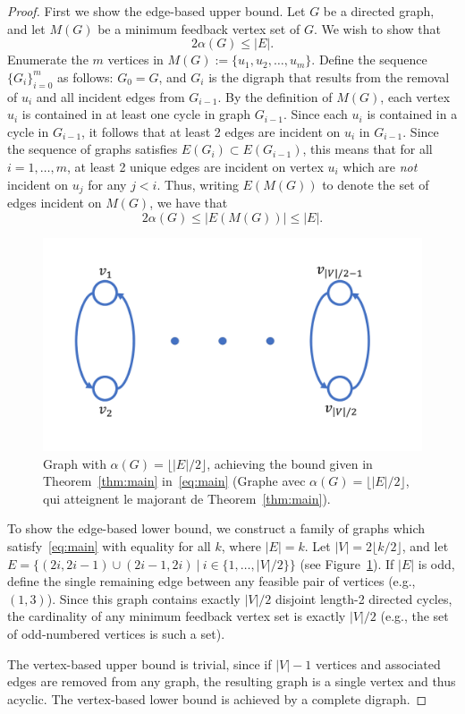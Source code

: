 \documentclass[CRMATH,Unicode,manuscript]{cedram}
\begin{document}
\begin{proof}
First we show the edge-based upper bound.
Let $G$ be a directed graph, and let $M(G)$ be a minimum feedback vertex set of $G$.
We wish to show that 
\begin{equation}
2\alpha(G)\leq |E|.
\end{equation}
Enumerate the $m$ vertices in $M(G):=\{u_1,u_2,\ldots,u_m\}$.
Define the sequence $\{G_i\}_{i=0}^m$ as follows: $G_0=G$, and $G_i$ is the digraph that results from the removal of $u_i$ and all incident edges from $G_{i-1}$.
By the definition of $M(G)$, each vertex $u_i$ is contained in at least one cycle in graph $G_{i-1}$.
Since each $u_i$ is contained in a cycle in $G_{i-1}$, it follows that at least 2 edges are incident on $u_i$ in $G_{i-1}$.
Since the sequence of graphs satisfies $E(G_{i})\subset E(G_{i-1})$, this means that for all $i=1,\ldots,m$, at least 2 unique edges are incident on vertex $u_i$ which are \emph{not} incident on $u_j$ for any $j<i$.
%
Thus, writing $E(M(G))$ to denote the set of edges incident on $M(G)$, we have that
\begin{equation}
2\alpha(G)\leq|E(M(G))|\leq |E|.
\end{equation}

\begin{figure}[b]
\centering
\includegraphics[width=.5\textwidth]{gfx/graph}
\caption{\label{fig:graph} Graph with $\alpha(G)=\lfloor|E|/2\rfloor$, achieving the bound given in Theorem~\ref{thm:main} in~\eqref{eq:main} (Graphe avec $\alpha(G)=\lfloor|E|/2\rfloor$, qui atteignent le majorant de Theorem~\ref{thm:main}).}
\end{figure}

To show the edge-based lower bound, we construct a family of graphs which satisfy~\eqref{eq:main} with equality for all $k$, where $|E|=k$.
Let $|V|=2\lfloor k/2\rfloor$, and let $E=\{(2i,2i-1)\cup(2i-1,2i)\ |\ i\in\{1,\ldots,|V|/2\}\}$ (see Figure~\ref{fig:graph}).
If $|E|$ is odd, define the single remaining edge between any feasible pair of vertices (e.g., $(1,3)$).
Since this graph contains exactly $|V|/2$ disjoint length-2 directed cycles, the cardinality of any minimum feedback vertex set is exactly $|V|/2$ (e.g., the set of odd-numbered vertices is such a set).
%


The vertex-based upper bound is trivial, since if $|V|-1$ vertices and associated edges are removed from any graph, the resulting graph is a single vertex and thus acyclic.
The vertex-based lower bound is achieved by a complete digraph.
\end{proof}








\end{document}
